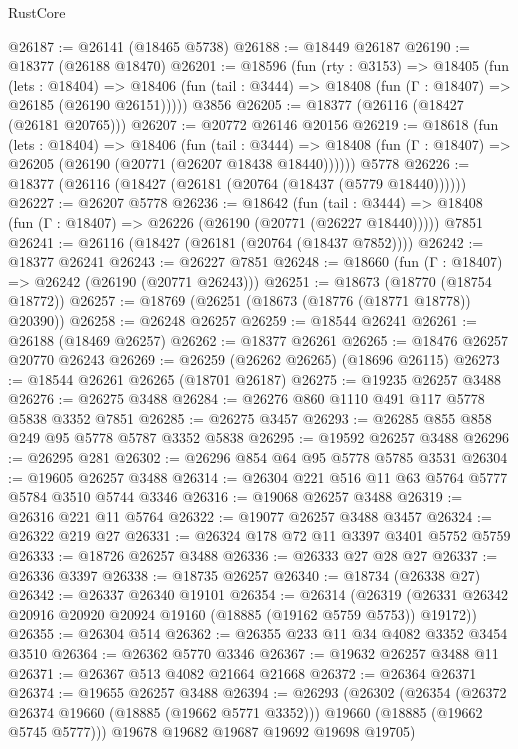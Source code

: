 \begin{lexlean}{RustCore}
\begin{coremodule}
@26187 := @26141 (@18465 @5738)
@26188 := @18449 @26187
@26190 := @18377 (@26188 @18470)
@26201 := @18596
    (fun (rty : @3153) =>
    @18405
      (fun (lets : @18404) =>
      @18406 (fun (tail : @3444) => @18408 (fun (Γ : @18407) => @26185 (@26190 @26151)))))
    @3856
@26205 := @18377 (@26116 (@18427 (@26181 @20765)))
@26207 := @20772 @26146 @20156
@26219 := @18618
    (fun (lets : @18404) =>
    @18406
      (fun (tail : @3444) =>
      @18408 (fun (Γ : @18407) => @26205 (@26190 (@20771 (@26207 @18438 @18440))))))
    @5778
@26226 := @18377 (@26116 (@18427 (@26181 (@20764 (@18437 (@5779 @18440))))))
@26227 := @26207 @5778
@26236 := @18642
    (fun (tail : @3444) => @18408 (fun (Γ : @18407) => @26226 (@26190 (@20771 (@26227 @18440)))))
    @7851
@26241 := @26116 (@18427 (@26181 (@20764 (@18437 @7852))))
@26242 := @18377 @26241
@26243 := @26227 @7851
@26248 := @18660 (fun (Γ : @18407) => @26242 (@26190 (@20771 @26243)))
@26251 := @18673 (@18770 (@18754 @18772))
@26257 := @18769 (@26251 (@18673 (@18776 (@18771 @18778)) @20390))
@26258 := @26248 @26257
@26259 := @18544 @26241
@26261 := @26188 (@18469 @26257)
@26262 := @18377 @26261
@26265 := @18476 @26257 @20770 @26243
@26269 := @26259 (@26262 @26265) (@18696 @26115)
@26273 := @18544 @26261 @26265 (@18701 @26187)
@26275 := @19235 @26257 @3488
@26276 := @26275 @3488
@26284 := @26276 @860 @1110 @491 @117 @5778 @5838 @3352 @7851
@26285 := @26275 @3457
@26293 := @26285 @855 @858 @249 @95 @5778 @5787 @3352 @5838
@26295 := @19592 @26257 @3488
@26296 := @26295 @281
@26302 := @26296 @854 @64 @95 @5778 @5785 @3531
@26304 := @19605 @26257 @3488
@26314 := @26304 @221 @516 @11 @63 @5764 @5777 @5784 @3510 @5744 @3346
@26316 := @19068 @26257 @3488
@26319 := @26316 @221 @11 @5764
@26322 := @19077 @26257 @3488 @3457
@26324 := @26322 @219 @27
@26331 := @26324 @178 @72 @11 @3397 @3401 @5752 @5759
@26333 := @18726 @26257 @3488
@26336 := @26333 @27 @28 @27
@26337 := @26336 @3397
@26338 := @18735 @26257
@26340 := @18734 (@26338 @27)
@26342 := @26337 @26340 @19101
@26354 := @26314
    (@26319 (@26331 @26342 @20916 @20920 @20924 @19160 (@18885 (@19162 @5759 @5753)) @19172))
@26355 := @26304 @514
@26362 := @26355 @233 @11 @34 @4082 @3352 @3454 @3510
@26364 := @26362 @5770 @3346
@26367 := @19632 @26257 @3488 @11
@26371 := @26367 @513 @4082 @21664 @21668
@26372 := @26364 @26371
@26374 := @19655 @26257 @3488
@26394 := @26293
    (@26302
      (@26354
        (@26372 @26374 @19660 (@18885 (@19662 @5771 @3352)))
        @19660
        (@18885 (@19662 @5745 @5777)))
      @19678
      @19682
      @19687
      @19692
      @19698
      @19705)

\end{coremodule}
\end{lexlean}
